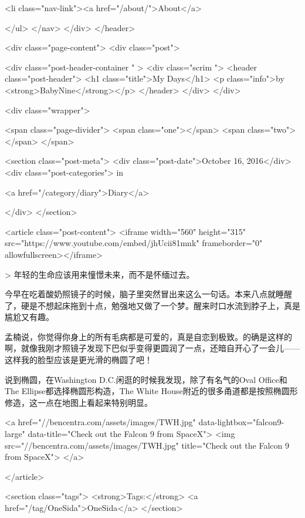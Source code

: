         
          
          <li class="nav-link"><a href="/about/">About</a>
          
        
          
        
          
        
          
        
      </ul>
    </nav>
  </div>
</header>


    <div class="page-content">
        <div class="post">

<div class="post-header-container " >
  <div class="scrim ">
    <header class="post-header">
      <h1 class="title">My Days</h1>
      <p class="info">by <strong>BabyNine</strong></p>
    </header>
  </div>
</div>

<div class="wrapper">

 <span class="page-divider">
  <span class="one"></span>
  <span class="two"></span>
</span>
 

<section class="post-meta">
  <div class="post-date">October 16, 2016</div>
  <div class="post-categories">
  in 
    
    <a href="/category/diary">Diary</a>
    
  
  </div>
</section>  

<article class="post-content">
  <iframe width="560" height="315" src="https://www.youtube.com/embed/jhUcii81mnk" frameborder="0" allowfullscreen></iframe>

> 年轻的生命应该用来憧憬未来，而不是怀缅过去。

今早在吃着酸奶照镜子的时候，脑子里突然冒出来这么一句话。本来八点就睡醒了，硬是不想起床拖到十点，勉强地又做了一个梦。醒来时口水流到脖子上，真是尴尬又有趣。

孟楠说，你觉得你身上的所有毛病都是可爱的，真是自恋到极致。的确是这样的啊，就像我刚才照镜子发现下巴似乎变得更圆润了一点，还暗自开心了一会儿——这样我的脸型应该是更光滑的椭圆了吧！

说到椭圆，在Washington D.C.闲逛的时候我发现，除了有名气的Oval Office和The Ellipse都选择椭圆形构造，The White House附近的很多甬道都是按照椭圆形修造，这一点在地图上看起来特别明显。

<a href="//bencentra.com/assets/images/TWH.jpg" data-lightbox="falcon9-large" data-title="Check out the Falcon 9 from SpaceX">
<img src="//bencentra.com/assets/images/TWH.jpg" title="Check out the Falcon 9 from SpaceX">
</a>

</article>



<section class="tags">
  <strong>Tags:</strong> <a href="/tag/OneSida">OneSida</a>
</section>



